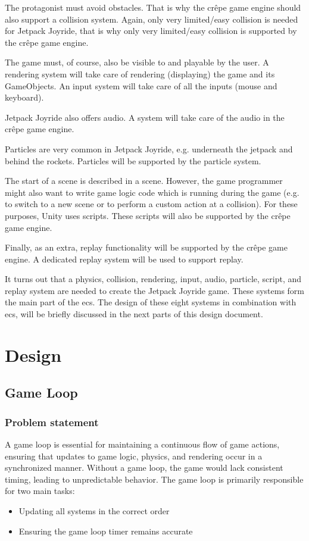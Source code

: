 \documentclass{projdoc}
\begin{document}
The protagonist must avoid obstacles. That is why the cr\^epe game engine should also
support a collision system. Again, only very limited/easy collision is needed for
Jetpack Joyride, that is why only very limited/easy collision is supported by the
cr\^epe game engine.

The game must, of course, also be visible to and playable by the user. A rendering
system will take care of rendering (displaying) the game and its GameObjects. An
input system will take care of all the inputs (mouse and keyboard).

Jetpack Joyride also offers audio. A system will take care of the audio in the
cr\^epe game engine.

Particles are very common in Jetpack Joyride, e.g. underneath the jetpack and behind
the rockets. Particles will be supported by the particle system.

The start of a scene is described in a scene. However, the game programmer might also
want to write game logic code which is running during the game (e.g. to switch to a
new scene or to perform a custom action at a collision). For these purposes, Unity
uses scripts. These scripts will also be supported by the cr\^epe game engine.

Finally, as an extra, replay functionality will be supported by the cr\^epe game
engine. A dedicated replay system will be used to support replay.

It turns out that a physics, collision, rendering, input, audio, particle, script,
and replay system are needed to create the Jetpack Joyride game. These systems form
the main part of the \gls{ecs}. The design of these eight systems in combination with
\gls{ecs}, will be briefly discussed in the next parts of this design document.

\section{Design}

\subsection{Game Loop}

\subsubsection{Problem statement}

A game loop is essential for maintaining a continuous flow of game actions, ensuring
that updates to game logic, physics, and rendering occur in a synchronized manner.
Without a game loop, the game would lack consistent timing, leading to unpredictable
behavior. The game loop is primarily responsible for two main tasks:\noparbreak
\begin{itemize}
	\item Updating all systems in the correct order
	\item Ensuring the game loop timer remains accurate
\end{itemize}
\end{document}
